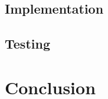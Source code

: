 \documentclass[a4paper,12pt,oneside]{report}
\begin{document}
\chapter{Implementation}


\chapter{Testing}


\part{Conclusion}


{

}

\end{document}
